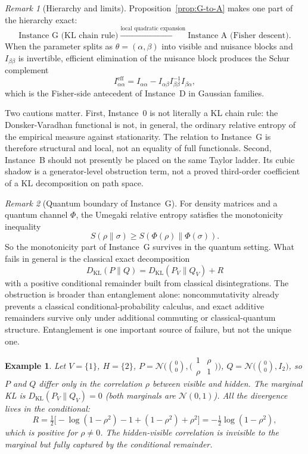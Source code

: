 \documentclass[11pt,a4paper]{article}
\numberwithin{equation}{section}
\theoremstyle{thmcompact}
\newtheorem{example}[theorem]{Example}
\theoremstyle{remark}
\newtheorem*{remarkplain}{Remark}
\newenvironment{remark}[1][]%
{\begin{remarkbox}\begin{remarkplain}[#1]\normalfont}
		{\end{remarkplain}\end{remarkbox}}
\begin{document}
\begin{remark}[Hierarchy and limits]\label{rem:G-hierarchy}
Proposition~\ref{prop:G-to-A} makes one part of the hierarchy exact:
\[
\text{Instance~G (KL chain rule)} \xrightarrow{\text{local quadratic expansion}} \text{Instance~A (Fisher descent)}.
\]
When the parameter splits as $\theta=(\alpha,\beta)$ into visible and nuisance blocks and $I_{\beta\beta}$ is invertible, efficient elimination of the nuisance block produces the Schur complement
\[
I^{\mathrm{eff}}_{\alpha\alpha}=I_{\alpha\alpha}-I_{\alpha\beta}I_{\beta\beta}^{-1}I_{\beta\alpha},
\]
which is the Fisher-side antecedent of Instance~D in Gaussian families.

Two cautions matter. First, Instance~0 is not literally a KL chain rule: the Donsker-Varadhan functional is not, in general, the ordinary relative entropy of the empirical measure against stationarity. The relation to Instance~G is therefore structural and local, not an equality of full functionals. Second, Instance~B should not presently be placed on the same Taylor ladder. Its cubic shadow is a generator-level obstruction term, not a proved third-order coefficient of a KL decomposition on path space.
\end{remark}

\begin{remark}[Quantum boundary of Instance~G]\label{rem:G-quantum}
For density matrices and a quantum channel $\Phi$, the Umegaki relative entropy satisfies the monotonicity inequality
\[
S(\rho\|\sigma)\ge S(\Phi(\rho)\|\Phi(\sigma)).
\]
So the monotonicity part of Instance~G survives in the quantum setting. What fails in general is the classical exact decomposition
\[
D_{\mathrm{KL}}(P\|Q)=D_{\mathrm{KL}}(P_V\|Q_V)+R
\]
with a positive conditional remainder built from classical disintegrations. The obstruction is broader than entanglement alone: noncommutativity already prevents a classical conditional-probability calculus, and exact additive remainders survive only under additional commuting or classical-quantum structure. Entanglement is one important source of failure, but not the unique one.
\end{remark}

\begin{example}\label{ex:bridge-G-toy}
Let $V = \{1\}$, $H = \{2\}$, $P = \mathcal{N}\bigl(\binom{0}{0}, \bigl(\begin{smallmatrix} 1 & \rho \\ \rho & 1 \end{smallmatrix}\bigr)\bigr)$, $Q = \mathcal{N}\bigl(\binom{0}{0}, I_2\bigr)$, so $P$ and $Q$ differ only in the correlation $\rho$ between visible and hidden. The marginal KL is $D_{\mathrm{KL}}(P_V \| Q_V) = 0$ (both marginals are $\mathcal{N}(0,1)$). All the divergence lives in the conditional:
\[
R = \tfrac{1}{2}\bigl[-\log(1 - \rho^2) - 1 + (1 - \rho^2) + \rho^2\bigr] = -\tfrac{1}{2}\log(1 - \rho^2),
\]
which is positive for $\rho \neq 0$. The hidden-visible correlation is invisible to the marginal but fully captured by the conditional remainder.
\end{example}
\end{document}
